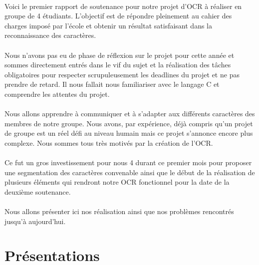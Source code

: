 \documentclass{article}
\begin{document}
	\paragraph{}
    Voici le premier rapport de soutenance pour notre projet d'OCR à réaliser en groupe de 4 étudiants. L'objectif est de répondre pleinement au cahier des charges imposé par l'école et obtenir un résultat satisfaisant dans la reconnaissance des caractères.
	
	\paragraph{}
    Nous n'avons pas eu de phase de réflexion sur le projet pour cette année et sommes directement entrés dans le vif du sujet et la réalisation des tâches obligatoires pour respecter scrupuleusement les deadlines du projet et ne pas prendre de retard. Il nous fallait nous familiariser avec le langage C et comprendre les attentes du projet.
	
	\paragraph{}
    Nous allons apprendre à communiquer et à s'adapter aux différents caractères des membres de notre groupe. Nous avons, par expérience, déjà compris qu'un projet de groupe est un réel défi au niveau humain mais ce projet s'annonce encore plus complexe.
    Nous sommes tous très motivés par la création de l'OCR.
	
	\paragraph{}
    Ce fut un gros investissement pour nous 4 durant ce premier mois pour proposer une segmentation des caractères convenable ainsi que le début de la réalisation de plusieurs éléments qui rendront notre OCR fonctionnel pour la date de la deuxième soutenance.

	\paragraph{}
    Nous allons présenter ici nos réalisation ainsi que nos problèmes rencontrés jusqu'à aujourd'hui.

\newpage
{}
\vspace*{2cm}
\section{Présentations}
\end{document}
